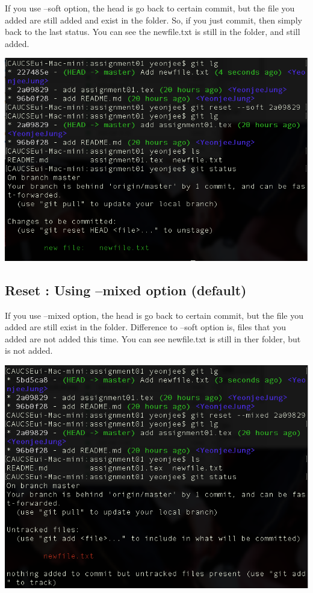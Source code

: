 \documentclass{article}
\begin{document}
If you use --soft option, the head is go back to certain commit, but the file you added are still added and exist in the folder. So, if you just commit, then simply back to the last status. You can see the newfile.txt is still in the folder, and still added.
\begin{center}
    \includegraphics[scale = 0.5]{pic/pic14.png}
\end{center}

\subsection{Reset : Using --mixed option (default)}

If you use --mixed option, the head is go back to certain commit, but the file you added are still exist in the folder. Difference to --soft option is, files that you added are not added this time. You can see newfile.txt is still in ther folder, but is not added.
\begin{center}
    \includegraphics[scale = 0.5]{pic/pic15.png}
\end{center}
\end{document}
